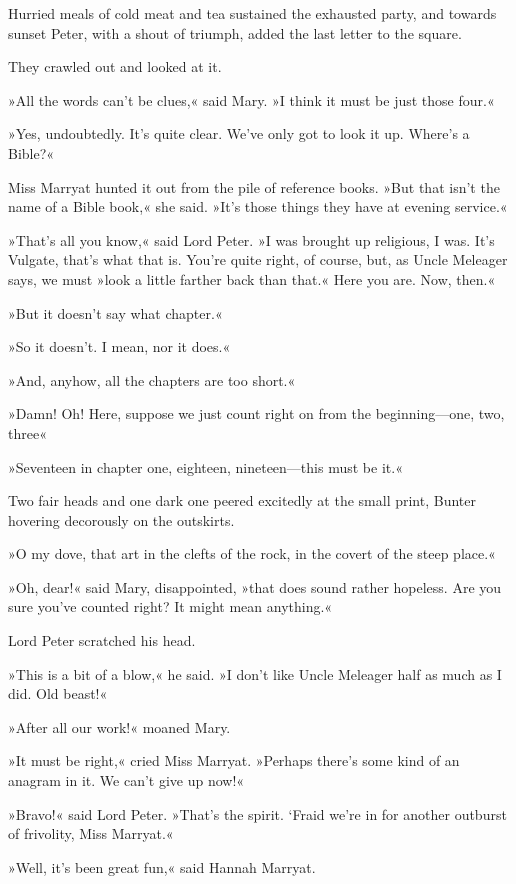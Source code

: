 Hurried meals of cold meat and tea sustained the exhausted party, and towards sunset Peter, with a shout of triumph, added the last letter to the square.

They crawled out and looked at it.

»All the words can't be clues,« said Mary. »I think it must be just those four.«

»Yes, undoubtedly. It's quite clear. We've only got to look it up. Where's a Bible?«

Miss Marryat hunted it out from the pile of reference books. »But that isn't the name of a Bible book,« she said. »It's those things they have at evening service.«

»That's all you know,« said Lord Peter. »I was brought up religious, I was. It's Vulgate, that's what that is. You're quite right, of course, but, as Uncle Meleager says, we must »look a little farther back than that.« Here you are. Now, then.«

»But it doesn't say what chapter.«

»So it doesn't. I mean, nor it does.«

»And, anyhow, all the chapters are too short.«

»Damn! Oh! Here, suppose we just count right on from the beginning—one, two, three\longdash«

»Seventeen in chapter one, eighteen, nineteen—this must be it.«

Two fair heads and one dark one peered excitedly at the small print, Bunter hovering decorously on the outskirts.

»O my dove, that art in the clefts of the rock, in the covert of the steep place.«

»Oh, dear!« said Mary, disappointed, »that does sound rather hopeless. Are you sure you've counted right? It might mean anything.«

Lord Peter scratched his head.

»This is a bit of a blow,« he said. »I don't like Uncle Meleager half as much as I did. Old beast!«

»After all our work!« moaned Mary.

»It must be right,« cried Miss Marryat. »Perhaps there's some kind of an anagram in it. We can't give up now!«

»Bravo!« said Lord Peter. »That's the spirit. `Fraid we're in for another outburst of frivolity, Miss Marryat.«

»Well, it's been great fun,« said Hannah Marryat.

